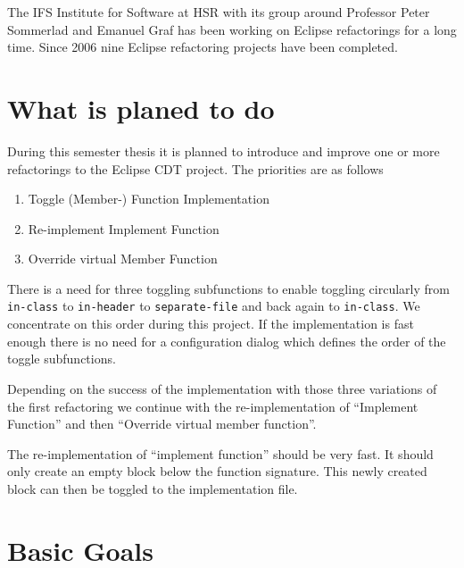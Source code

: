 \documentclass[a4paper,12pt,abstract=on]{scrreprt}
\begin{document}
The IFS Institute for Software at HSR with its group around Professor Peter
Sommerlad and
Emanuel Graf has been working on Eclipse refactorings for a long time. Since
2006 nine Eclipse refactoring projects have been completed.\newline

\section{What is planed to do}

During this semester thesis it is planned to introduce and improve one or more
refactorings to the Eclipse CDT project. The priorities are as follows

\begin{enumerate}
\item Toggle (Member-) Function Implementation
\item Re-implement Implement Function
\item Override virtual Member Function
\end{enumerate}

There is a need for three toggling subfunctions to enable toggling circularly
from \texttt{in-class}
to \texttt{in-header} to \texttt{separate-file}  and back again to
\texttt{in-class}. We concentrate on this order during this project. If the
implementation is fast enough there is no need for a configuration dialog which
defines the order of the toggle subfunctions.\newline

Depending on the success of the implementation with those three variations of
the
first refactoring we continue with the re-implementation of  ``Implement
Function'' and then ``Override virtual member function''.\newline

The re-implementation of ``implement function'' should be very fast. It should
only create an empty block below the function signature. This newly created
block can then be toggled to the implementation file.

\section{Basic Goals}
\end{document}
